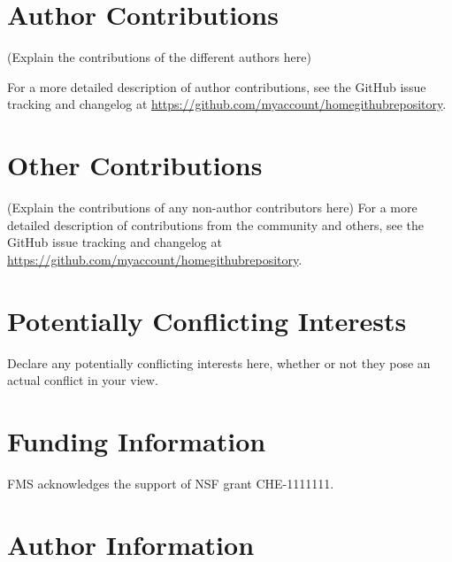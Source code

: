 \documentclass[9pt,tutorial]{livecoms}
\newcommand{\githubrepository}{\url{https://github.com/myaccount/homegithubrepository}}  %
\begin{document}
\section*{Author Contributions}
%

(Explain the contributions of the different authors here)

For a more detailed description of author contributions,
see the GitHub issue tracking and changelog at \githubrepository.

\section*{Other Contributions}
%

(Explain the contributions of any non-author contributors here)
For a more detailed description of contributions from the community and others, see the GitHub issue tracking and changelog at \githubrepository.

\section*{Potentially Conflicting Interests}

Declare any potentially conflicting interests here, whether or not they pose an actual conflict in your view.

\section*{Funding Information}
FMS acknowledges the support of NSF grant CHE-1111111.

\section*{Author Information}
\makeorcid




\end{document}
